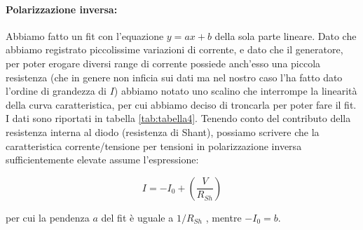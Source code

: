 \documentclass{article}
\begin{document}
\newpage

\paragraph{Polarizzazione inversa:}
Abbiamo fatto un fit con l'equazione $y=ax+b$ della sola parte lineare. Dato che abbiamo registrato piccolissime variazioni di corrente, e dato che il generatore, per poter erogare diversi range di corrente possiede anch'esso una piccola resistenza (che in genere non inficia sui dati ma nel nostro caso l'ha fatto dato l'ordine di grandezza di $I$) abbiamo notato uno scalino che interrompe la linearità della curva caratteristica, per cui abbiamo deciso di troncarla per poter fare il fit. I dati sono riportati in tabella \ref{tab:tabella4}. Tenendo conto del contributo della resistenza interna al diodo (resistenza di Shant), possiamo scrivere che la caratteristica corrente/tensione per tensioni in polarizzazione inversa sufficientemente elevate assume l'espressione:

$$I=-I_0+\left(\frac{V}{R_{Sh}} \right)$$ 

per cui la pendenza $a$ del fit è uguale a $1/R_{Sh}$ ,  mentre $-I_0=b$.
\end{document}
